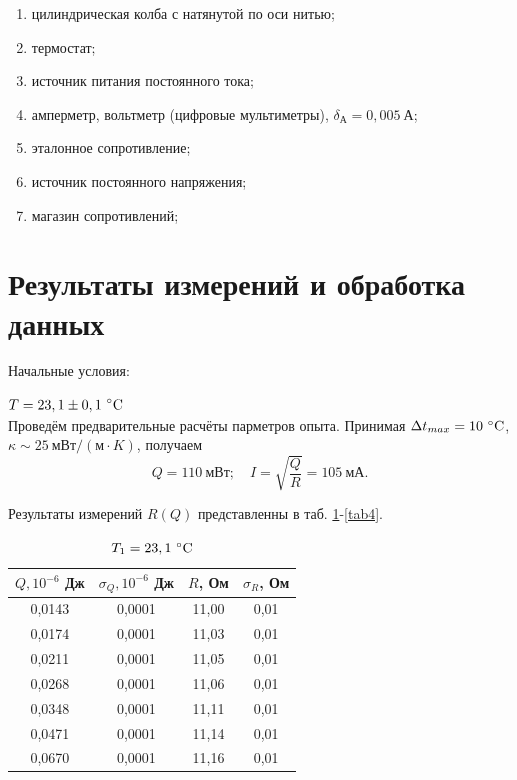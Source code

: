 \documentclass[a4paper, 12pt]{article}
\begin{document}
\begin{enumerate}
    \item цилиндрическая колба с натянутой по оси нитью;
    \item термостат;
    \item источник питания постоянного тока;
    \item амперметр, вольтметр (цифровые мультиметры), $\delta_{А} = 0,005~А$;
    \item эталонное сопротивление;
    \item источник постоянного напряжения;
    \item магазин сопротивлений;
\end{enumerate}

\section{Результаты измерений и обработка данных}

Начальные условия:

$\begin{aligned}
& T = 23,1\pm0,1~\celsius
\end{aligned}$\\[0,5 cm]

Проведём предварительные расчёты парметров опыта. Принимая $\Delta{t_{max}} = 10~\celsius$, \\ $\kappa \sim 25~мВт/(м\cdot{K})$, получаем $$Q = 110~мВт; \quad I = \sqrt{\frac{Q}{R}} = 105~мА.$$

Результаты измерений $R(Q)$ представленны в таб. \ref{tab1}-\ref{tab4}.

\begin{table}[h!]
\begin{center}
\begin{tabular}{|c|c|c|c|}
\hline
$Q, 10^{-6}$ Дж & $\sigma_Q, 10^{-6}$ Дж & $R$, Ом & $\sigma_R$, Ом \\ \hline
0,0143 & 0,0001 & 11,00 & 0,01 \\ \hline
0,0174 & 0,0001 & 11,03 & 0,01 \\ \hline
0,0211 & 0,0001 & 11,05 & 0,01 \\ \hline
0,0268 & 0,0001 & 11,06 & 0,01 \\ \hline
0,0348 & 0,0001 & 11,11 & 0,01 \\ \hline
0,0471 & 0,0001 & 11,14 & 0,01 \\ \hline
0,0670 & 0,0001 & 11,16 & 0,01 \\ \hline
\end{tabular}
\end{center}
\caption{$T_1 = 23,1~\celsius$}
\label{tab1}
\end{table} 
\end{document}
